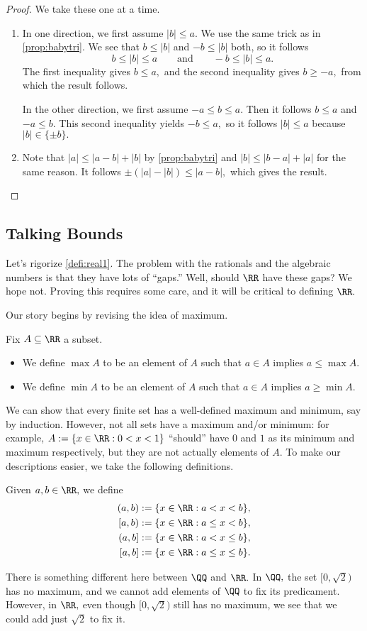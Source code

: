 \documentclass[../notes.tex]{subfiles}
\begin{document}
\begin{proof}
	We take these one at a time.
	\begin{enumerate}[label=(\alph*)]
		\item In one direction, we first assume $|b|\le a.$ We use the same trick as in \autoref{prop:babytri}. We see that $b\le|b|$ and $-b\le|b|$ both, so it follows
		\[b\le|b|\le a\qquad\text{and}\qquad-b\le|b|\le a.\]
		The first inequality gives $b\le a,$ and the second inequality gives $b\ge-a,$ from which the result follows.
		
		In the other direction, we first assume $-a\le b\le a.$ Then it follows $b\le a$ and $-a\le b.$ This second inequality yields $-b\le a,$ so it follows $|b|\le a$ because $|b|\in\{\pm b\}.$
		\item Note that $|a|\le|a-b|+|b|$ by \autoref{prop:babytri} and $|b|\le|b-a|+|a|$ for the same reason. It follows $\pm(|a|-|b|)\le|a-b|,$ which gives the result.
		\qedhere
	\end{enumerate}
\end{proof}

\subsection{Talking Bounds}
Let's rigorize \autoref{defi:real1}. The problem with the rationals and the algebraic numbers is that they have lots of ``gaps.'' Well, should $\RR$ have these gaps? We hope not. Proving this requires some care, and it will be critical to defining $\RR.$

Our story begins by revising the idea of maximum.
\begin{defi}
	Fix $A\subseteq\RR$ a subset.
	\begin{itemize}
		\item We define $\max A$ to be an element of $A$ such that $a\in A$ implies $a\le\max A.$
		\item We define $\min A$ to be an element of $A$ such that $a\in A$ implies $a\ge\min A.$
	\end{itemize}
\end{defi}
We can show that every finite set has a well-defined maximum and minimum, say by induction. However, not all sets have a maximum and/or minimum: for example, $A:=\{x\in\RR:0<x<1\}$ ``should'' have $0$ and $1$ as its minimum and maximum respectively, but they are not actually elements of $A.$ To make our descriptions easier, we take the following definitions.
\begin{defi}
	Given $a,b\in\RR,$ we define
	\begin{align*}
		(a,b):=\{x\in\RR:a<x<b\}, \\
		[a,b):=\{x\in\RR:a\le x<b\}, \\
		(a,b]:=\{x\in\RR:a<x\le b\}, \\
		[a,b]:=\{x\in\RR:a\le x\le b\}.
	\end{align*}
\end{defi}
There is something different here between $\QQ$ and $\RR.$ In $\QQ,$ the set $[0,\sqrt2)$ has no maximum, and we cannot add elements of $\QQ$ to fix its predicament. However, in $\RR,$ even though $[0,\sqrt2)$ still has no maximum, we see that we could add just $\sqrt2$ to fix it.
\end{document}
